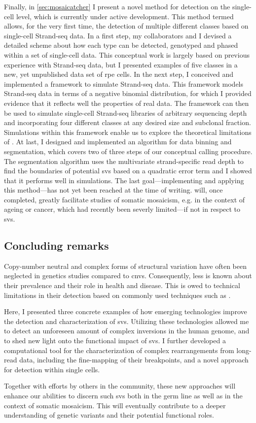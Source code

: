 Finally, in \cref{sec:mosaicatcher} I present a novel method for \sv detection on
the single-cell level, which is currently under active development. This method
termed \mc allows, for the very first time, the detection of
multiple different \sv classes based on single-cell Strand-seq data. In a first
step, my collaborators and I devised a detailed scheme about how each \sv type
can be detected, genotyped and phased within a set of single-cell data. This
conceptual work is largely based on previous experience with Strand-seq data,
but I presented examples of five \sv classes in a new, yet
unpublished data set of \acl{rpe} cells. In the next step, I conceived and
implemented a framework to simulate Strand-seq data. This framework models
Strand-seq data in terms of a negative binomial distribution, for which I
provided evidence that it reflects well the properties of real data. The
framework can then be used to simulate single-cell Strand-seq libraries of
arbitrary sequencing depth and incorporating four
different \sv classes at any desired size and subclonal fraction. Simulations
within this framework enable us to explore the theoretical limitations of
\mc. At last, I designed and implemented an algorithm for data binning
and segmentation, which covers two of three steps of our conceptual \sv calling
procedure. The segmentation algorithm uses the multivariate strand-specific read
depth to find the boundaries of potential \acp{sv} based on a quadratic error
term and I showed that it performs well in
simulations. The last goal---implementing and applying this method---has not yet
been reached at the time of writing. \mc will, once completed, greatly
facilitate studies of somatic mosaicism, e.g. in the context of ageing or cancer,
which had recently been severly limited---if not in respect to \acp{sv}.




\subsection{Concluding remarks}
Copy-number neutral and complex forms of structural variation have often been
neglected in genetics studies compared to \acp{cnv}. Consequently, less is known
about their prevalence and their role in health and disease. This is owed to
technical limitations in their detection based on commonly used techniques
such as \mps.

Here, I presented three concrete examples of how emerging technologies improve
the detection and characterization of \acp{sv}. Utilizing these technologies
allowed me to detect an unforeseen amount of complex inversions in the human
genome, and to shed new light onto the functional impact of \acp{sv}.
I further developed a computational tool for the characterization of complex
rearrangements from long-read data, including the fine-mapping of their
breakpoints, and a novel approach for \sv detection within single cells.

Together with efforts by others in the community, these new approaches will
enhance our abilities to discern such \acp{sv} both in the germ line as well as
in the context of somatic mosaicism. This will eventually contribute to a deeper
understanding of genetic variants and their potential functional roles.


